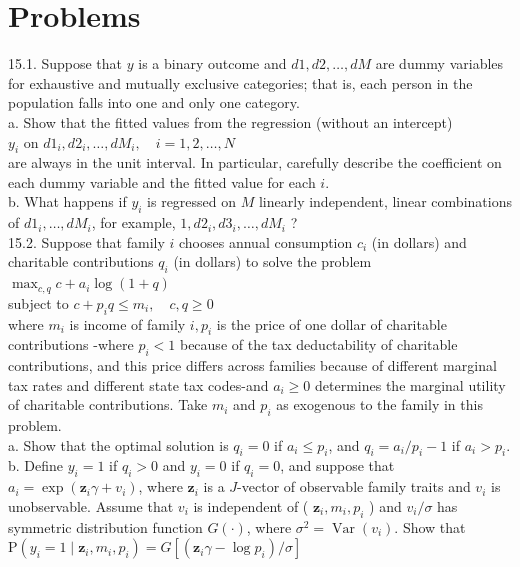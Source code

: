 \documentclass[10pt]{article}
\begin{document}
\section*{Problems}
15.1. Suppose that $y$ is a binary outcome and $d 1, d 2, \ldots, d M$ are dummy variables for exhaustive and mutually exclusive categories; that is, each person in the population falls into one and only one category.\\
a. Show that the fitted values from the regression (without an intercept)\\
$y_{i}$ on $d 1_{i}, d 2_{i}, \ldots, d M_{i}, \quad i=1,2, \ldots, N$\\
are always in the unit interval. In particular, carefully describe the coefficient on each dummy variable and the fitted value for each $i$.\\
b. What happens if $y_{i}$ is regressed on $M$ linearly independent, linear combinations of $d 1_{i}, \ldots, d M_{i}$, for example, $1, d 2_{i}, d 3_{i}, \ldots, d M_{i}$ ?\\
15.2. Suppose that family $i$ chooses annual consumption $c_{i}$ (in dollars) and charitable contributions $q_{i}$ (in dollars) to solve the problem\\
$\max _{c, q} c+a_{i} \log (1+q)$\\
subject to $c+p_{i} q \leq m_{i}, \quad c, q \geq 0$\\
where $m_{i}$ is income of family $i, p_{i}$ is the price of one dollar of charitable contributions -where $p_{i}<1$ because of the tax deductability of charitable contributions, and this price differs across families because of different marginal tax rates and different state tax codes-and $a_{i} \geq 0$ determines the marginal utility of charitable contributions. Take $m_{i}$ and $p_{i}$ as exogenous to the family in this problem.\\
a. Show that the optimal solution is $q_{i}=0$ if $a_{i} \leq p_{i}$, and $q_{i}=a_{i} / p_{i}-1$ if $a_{i}>p_{i}$.\\
b. Define $y_{i}=1$ if $q_{i}>0$ and $y_{i}=0$ if $q_{i}=0$, and suppose that $a_{i}=\exp \left(\mathbf{z}_{i} \gamma+v_{i}\right)$, where $\mathbf{z}_{i}$ is a $J$-vector of observable family traits and $v_{i}$ is unobservable. Assume that $v_{i}$ is independent of ( $\mathbf{z}_{i}, m_{i}, p_{i}$ ) and $v_{i} / \sigma$ has symmetric distribution function $G(\cdot)$, where $\sigma^{2}=\operatorname{Var}\left(v_{i}\right)$. Show that\\
$\mathrm{P}\left(y_{i}=1 \mid \mathbf{z}_{i}, m_{i}, p_{i}\right)=G\left[\left(\mathbf{z}_{i} \gamma-\log p_{i}\right) / \sigma\right]$\\
\end{document}
